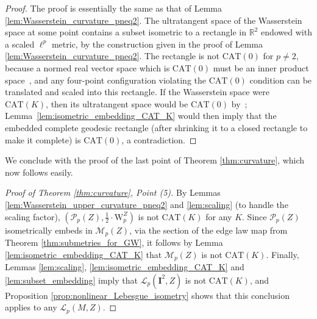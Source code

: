 \documentclass{article}
\theoremstyle{definition}
\newcommand{\M}{\mathcal{M}}
\newcommand{\MZp}{\M_p(Z)}
\newcommand{\WZ}{\mathcal{P}_p(Z)}
\newcommand{\wz}{\mathrm{W}_p^Z}
\newcommand{\Lp}{\mathcal{L}_p}
\begin{document}
\begin{proof}
    The proof is essentially the same as that of Lemma \ref{lem:Wasserstein_curvature_pneq2}. The ultratangent space of the Wasserstein space  at some point contains a subset isometric to a rectangle in $\mathbb{R}^2$ endowed with a scaled $\ell^p$ metric, by the construction given in the proof of Lemma \ref{lem:Wasserstein_curvature_pneq2}.
    The rectangle is not $\mathrm{CAT}(0)$ for $p\neq 2$, because a normed
    real vector space which is $\mathrm{CAT}(0)$ must be an inner product
    space~\cite[Proposition II.1.14]{bridsonhaefliger1999}, and any four-point
    configuration violating the $\mathrm{CAT}(0)$ condition can be translated
    and scaled into this rectangle. If the Wasserstein space were
    $\mathrm{CAT}(K)$, then its ultratangent space would be $\mathrm{CAT}(0)$
    by~\cite[Theorem 13.1]{alexander2024alexandrov}; Lemma~\ref{lem:isometric_embedding_CAT_K} would then
    imply that the embedded complete geodesic rectangle (after shrinking it to a closed rectangle to make it complete) is $\mathrm{CAT}(0)$,
    a contradiction.

    
\end{proof}


We conclude with the proof of the last point of Theorem \ref{thm:curvature}, which now follows easily.

\begin{proof}[Proof of Theorem \ref{thm:curvature}, Point (5)]
    By Lemmas \ref{lem:Wasserstein_upper_curvature_pneq2} and \ref{lem:scaling} (to handle the scaling factor), $(\WZ,\frac{1}{2}\cdot \wz)$ is not $\mathrm{CAT}(K)$ for any $K$. Since $\WZ$ isometrically embeds in $\MZp$, via the section of the edge law map from Theorem \ref{thm:submetries_for_GW}, it follows by Lemma \ref{lem:isometric_embedding_CAT_K} that $\MZp$ is not $\mathrm{CAT}(K)$. Finally, Lemmas \ref{lem:scaling}, \ref{lem:isometric_embedding_CAT_K} and \ref{lem:subset_embedding} imply that $\Lp(\mathbf{I}^2,Z)$ is not $\mathrm{CAT}(K)$, and Proposition \ref{prop:nonlinear_Lebesgue_isometry} shows that this conclusion applies to any $\Lp(M,Z)$.
\end{proof}
%
%
%
%
%
%
%
%
%
%
%
%
%
%
%
%
%
%
%
%
%
%
%
%
%
%
%
%
%
%
%
%
%
%
%

\printbibliography
\end{document}
